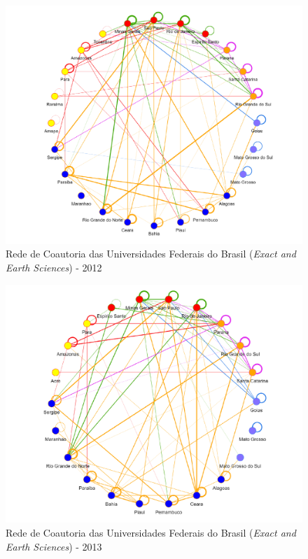 \begin{figure}[H]
	\centering
	\includegraphics[width=\linewidth]{Imagens/rede-exact-br-2012.pdf}
	\caption{Rede de Coautoria das Universidades Federais do Brasil (\textit{Exact and Earth Sciences}) - 2012}
	\label{Rede de Coautoria - UF EXACT BR 2012}
\end{figure}

\begin{figure}[H]
	\centering
	\includegraphics[width=\linewidth]{Imagens/rede-exact-br-2013.pdf}
	\caption{Rede de Coautoria das Universidades Federais do Brasil (\textit{Exact and Earth Sciences}) - 2013}
	\label{Rede de Coautoria - UF EXACT BR 2013}
\end{figure}

